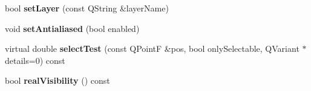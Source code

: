 \begin{DoxyCompactItemize}
bool {\bfseries set\+Layer} (const Q\+String \&layer\+Name)
\item 
\mbox{\label{class_q_c_p_layerable_a4fd43e89be4a553ead41652565ff0581}} 
void {\bfseries set\+Antialiased} (bool enabled)
\item 
\mbox{\label{class_q_c_p_layerable_a15bfc6b8990b1fd6b8c9541a920d07f4}} 
virtual double {\bfseries select\+Test} (const Q\+PointF \&pos, bool only\+Selectable, Q\+Variant $\ast$details=0) const
\item 
\mbox{\label{class_q_c_p_layerable_ab054e88f15d485defcb95e7376f119e7}} 
bool {\bfseries real\+Visibility} () const
\end{DoxyCompactItemize}

